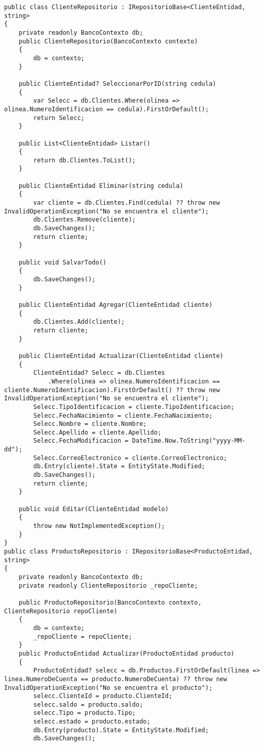 \documentclass[executivepaper]{article}
\begin{document}
\begin{lstlisting}
public class ClienteRepositorio : IRepositorioBase<ClienteEntidad, string>
{
    private readonly BancoContexto db;
    public ClienteRepositorio(BancoContexto contexto)
    {
        db = contexto;
    }

    public ClienteEntidad? SeleccionarPorID(string cedula)
    {
        var Selecc = db.Clientes.Where(olinea => olinea.NumeroIdentificacion == cedula).FirstOrDefault();
        return Selecc;
    }

    public List<ClienteEntidad> Listar()
    {
        return db.Clientes.ToList();
    }

    public ClienteEntidad Eliminar(string cedula)
    {
        var cliente = db.Clientes.Find(cedula) ?? throw new InvalidOperationException("No se encuentra el cliente");
        db.Clientes.Remove(cliente);
        db.SaveChanges();
        return cliente;
    }

    public void SalvarTodo()
    {
        db.SaveChanges();
    }

    public ClienteEntidad Agregar(ClienteEntidad cliente)
    {
        db.Clientes.Add(cliente);
        return cliente;
    }

    public ClienteEntidad Actualizar(ClienteEntidad cliente)
    {
        ClienteEntidad? Selecc = db.Clientes
            .Where(olinea => olinea.NumeroIdentificacion == cliente.NumeroIdentificacion).FirstOrDefault() ?? throw new InvalidOperationException("No se encuentra el cliente");
        Selecc.TipoIdentificacion = cliente.TipoIdentificacion;
        Selecc.FechaNacimiento = cliente.FechaNacimiento;
        Selecc.Nombre = cliente.Nombre;
        Selecc.Apellido = cliente.Apellido;
        Selecc.FechaModificacion = DateTime.Now.ToString("yyyy-MM-dd");
        Selecc.CorreoElectronico = cliente.CorreoElectronico;
        db.Entry(cliente).State = EntityState.Modified;
        db.SaveChanges();
        return cliente;
    }

    public void Editar(ClienteEntidad modelo)
    {
        throw new NotImplementedException();
    }
}
public class ProductoRepositorio : IRepositorioBase<ProductoEntidad, string>
{
    private readonly BancoContexto db;
    private readonly ClienteRepositorio _repoCliente;

    public ProductoRepositorio(BancoContexto contexto, ClienteRepositorio repoCliente)
    {
        db = contexto;
        _repoCliente = repoCliente;
    }
    public ProductoEntidad Actualizar(ProductoEntidad producto)
    {
        ProductoEntidad? selecc = db.Productos.FirstOrDefault(linea => linea.NumeroDeCuenta == producto.NumeroDeCuenta) ?? throw new InvalidOperationException("No se encuentra el producto");
        selecc.ClienteId = producto.ClienteId;
        selecc.saldo = producto.saldo;
        selecc.Tipo = producto.Tipo;
        selecc.estado = producto.estado;
        db.Entry(producto).State = EntityState.Modified;
        db.SaveChanges();


\end{lstlisting}
\end{document}
